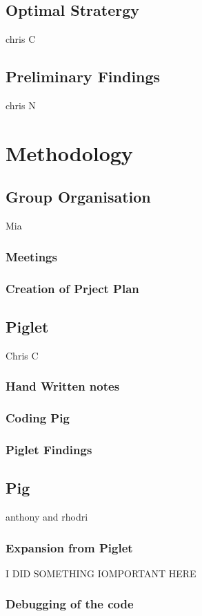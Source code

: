 \documentclass[a4paper,titlepage]{article}
\begin{document}
\subsection{Optimal Stratergy}
chris C
\subsection{Preliminary Findings}
chris N


\section{Methodology}
\subsection{Group Organisation}
Mia
\subsubsection{Meetings}
\subsubsection{Creation of Prject Plan}

\subsection{Piglet}
Chris C
\subsubsection{Hand Written notes}
\subsubsection{Coding Pig}
\subsubsection{Piglet Findings}

\subsection{Pig}
anthony and rhodri
\subsubsection{Expansion from Piglet}

I DID SOMETHING IOMPORTANT HERE

\subsubsection{Debugging of the code}
\end{document}
